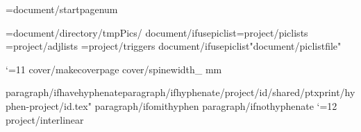 \def\RHnoVoddleft{{{header/noVoddleft}}}
\def\RHnoVoddcenter{{{header/noVoddcenter}}}
\def\RHnoVoddright{{{header/noVoddright}}}


\def\RFoddcenter{{{footer/oddcenter}}}
\def\RFevencenter{{{footer/oddcenter}}}
\def\RFtitleevencenter{{{footer/titleevencenter}}}
\def\RFtitleoddcenter{{{footer/titleoddcenter}}}
\def\RFnoVoddcenter{{{footer/oddcenter}}}
\def\RFnoVevencenter{{{footer/oddcenter}}}
  
\pageno={document/startpagenum}

\PicPath={{{document/directory}/tmpPics/}}
{document/ifusepiclist}\PicListPath={{{project/piclists}}}
\AdjListPath={{{project/adjlists}}}
\TrigListPath={{{project/triggers}}}
{document/ifusepiclist}\openpiclist "{document/piclistfile}"

\catcode`\@=11
{cover/makecoverpage}
\expandafter\def\csname cover-y-spine\endcsname{{{cover/spinewidth_} mm}}
\expandafter\def\csname cover-y\endcsname{{\the\PaperHeight}}
\expandafter\def\csname cover-x\endcsname{{\the\PaperWidth}}

\def\b{{\the\p@rstylehooks \par\bgroup\s@tbaseline{{b}}\vskip\baselineskip\egroup}}
\newlanguage\langund \language\langund
{paragraph/ifhavehyphenate}{paragraph/ifhyphenate}\bgroup{}/{project/id}/shared/ptxprint/hyphen-{project/id}.tex" \egroup
{paragraph/ifomithyphen}
{paragraph/ifnothyphenate} 
\catcode`\@=12
\let\pb=\pagebreak
{project/interlinear}\expandafter\def\csname complex-rb\endcsname{{}}


